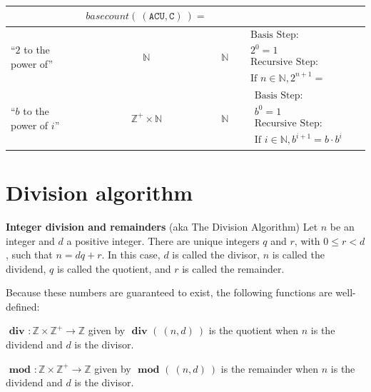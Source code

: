 \documentclass[12pt, oneside]{article}
\newcommand{\A}[0]{\texttt{A}}
\newcommand{\C}[0]{\texttt{C}}
\newcommand{\U}[0]{\texttt{U}}
\begin{document}
\begin{center}
\begin{tabular}{p{0.65in}ccp{2.4in}p{2.4in}}
{\begin{align*}
    \end{align*}} & 
    {\begin{align*}
        basecount(~(\A\C\U, \C)~) = 
    \end{align*}}\\
\hline
``$2$ to the power of''& $\mathbb{N}$ & $\mathbb{N}$ & 
{\begin{align*}    
&\textrm{Basis Step:} \\
&2^0= 1 \\
&\textrm{Recursive Step:}\\
&\textrm{If } n \in \mathbb{N}, 2^{n+1} = \phantom{2 \cdot 2^n}
\end{align*}}\\
\hline
``$b$ to the power of $i$''& $\mathbb{Z}^+ \times \mathbb{N}$ & $\mathbb{N}$ & 
{\begin{align*}    
&\textrm{Basis Step:} \\
&b^0 = 1 \\
&\textrm{Recursive Step:}\\
&\textrm{If } i \in \mathbb{N}, b^{i+1} = b \cdot b^i
\end{align*}}
\end{tabular}
\end{center}

\newpage \vfill
\section*{Division algorithm}


{\bf Integer division and remainders} (aka The Division Algorithm) Let $n$ be an integer 
and $d$ a positive integer. There are unique integers $q$ and $r$, with $0 \leq r < d$, such that 
$n = dq + r$. In this case, $d$ is called the divisor, $n$ is called the dividend, 
$q$ is called the quotient, 
and $r$ is called the remainder. 

Because these numbers are guaranteed to exist, the following functions are well-defined: 

$\textbf{ div } : \mathbb{Z} \times \mathbb{Z}^+ \to \mathbb{Z}$ given by $\textbf{ div } ( ~(n,d)~)$ 
is the quotient when $n$ is the dividend and $d$ is the divisor.

$\textbf{ mod } : \mathbb{Z} \times \mathbb{Z}^+ \to \mathbb{Z}$ given by $\textbf{ mod } ( ~(n,d)~)$ 
is the remainder when $n$ is the dividend and $d$ is the divisor.
\end{document}
